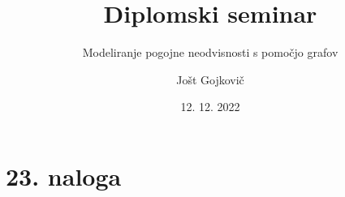 \documentclass{beamer}
\title{Diplomski seminar}
\subtitle{Modeliranje pogojne neodvisnosti s pomočjo grafov}
\author{Jošt Gojkovič}
\institute[FMF] {Fakulteta za matematiko in fiziko}
\date{12. 12. 2022}
\begin{document}
\begin{frame}
    \titlepage         %
  \end{frame}
  

\section{23. naloga}

\begin{frame}

   
\end{frame}
\end{document}
